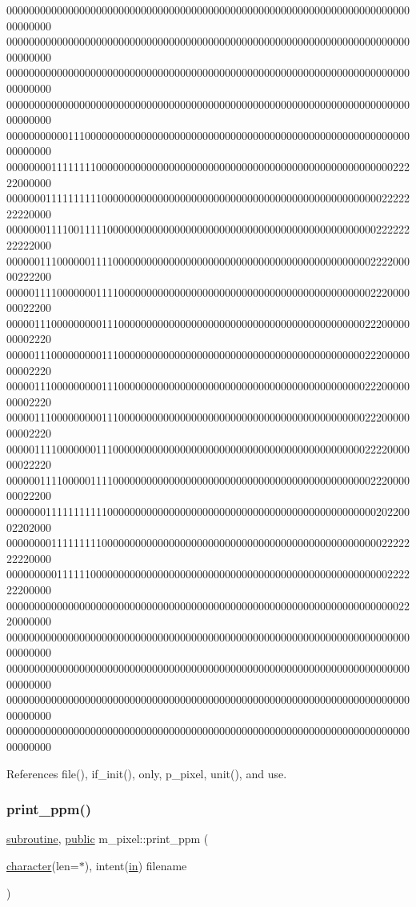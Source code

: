 00000000000000000000000000000000000000000000000000000000000000000000000000000000 00000000000000000000000000000000000000000000000000000000000000000000000000000000 00000000000000000000000000000000000000000000000000000000000000000000000000000000 00000000000000000000000000000000000000000000000000000000000000000000000000000000 00000000000111000000000000000000000000000000000000000000000000000000000000000000 00000000111111110000000000000000000000000000000000000000000000000000022222000000 00000001111111111000000000000000000000000000000000000000000000000002222222220000 00000001111001111100000000000000000000000000000000000000000000000022222222222000 00000011100000011110000000000000000000000000000000000000000000000222200000222200 00000111100000001111000000000000000000000000000000000000000000000222000000022200 00000111000000000111000000000000000000000000000000000000000000002220000000002220 00000111000000000111000000000000000000000000000000000000000000002220000000002220 00000111000000000111000000000000000000000000000000000000000000002220000000002220 00000111000000000111000000000000000000000000000000000000000000002220000000002220 00000111100000001110000000000000000000000000000000000000000000002222000000022220 00000011110000011110000000000000000000000000000000000000000000000222000000022200 00000001111111111100000000000000000000000000000000000000000000000020220002202000 00000000111111111000000000000000000000000000000000000000000000000002222222220000 00000000011111100000000000000000000000000000000000000000000000000000222222200000 00000000000000000000000000000000000000000000000000000000000000000000002220000000 00000000000000000000000000000000000000000000000000000000000000000000000000000000 00000000000000000000000000000000000000000000000000000000000000000000000000000000 00000000000000000000000000000000000000000000000000000000000000000000000000000000 00000000000000000000000000000000000000000000000000000000000000000000000000000000 

References file(), if\+\_\+init(), only, p\+\_\+pixel, unit(), and use.

\mbox{\label{namespacem__pixel_a01797b04ce7c693c3fd6a841e8d1de48}} 
\subsubsection{\texorpdfstring{print\+\_\+ppm()}{print\_ppm()}}
{\footnotesize\ttfamily \hyperlink{M__stopwatch_83_8txt_acfbcff50169d691ff02d4a123ed70482}{subroutine}, \hyperlink{M__stopwatch_83_8txt_a2f74811300c361e53b430611a7d1769f}{public} m\+\_\+pixel\+::print\+\_\+ppm (\begin{DoxyParamCaption}\item[{\hyperlink{option__stopwatch_83_8txt_abd4b21fbbd175834027b5224bfe97e66}{character}(len=$\ast$), intent(\hyperlink{M__journal_83_8txt_afce72651d1eed785a2132bee863b2f38}{in})}]{filename }\end{DoxyParamCaption})}



